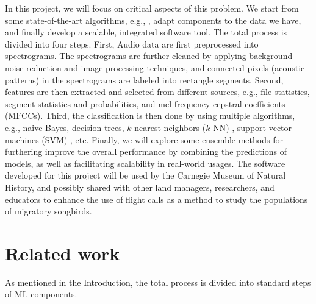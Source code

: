 \documentclass{article} %
\begin{document}
In this project, we will focus on critical aspects of this problem. We start from some state-of-the-art algorithms, e.g., \cite{mlsp2,chennovel13,briggs2013instance,Lasseck13,Massaron13,stattnersong13}, adapt components to the data we have, and finally develop a scalable, integrated software tool. The total process is divided into four steps. First, Audio data are first preprocessed into spectrograms. The spectrograms are further cleaned by applying background noise reduction and image processing techniques, and connected pixels (acoustic patterns) in the spectrograms are labeled into rectangle segments. Second, features are then extracted and selected from different sources, e.g., file statistics, segment statistics and probabilities, and mel-frequency cepstral coefficients (MFCCs). Third, the classification is then done by using multiple algorithms, e.g., naive Bayes, decision trees, $k$-nearest neighbors ($k$-NN) \cite{cover1967nearest}, support vector machines (SVM) \cite{cortes1995support}, etc. Finally, we will explore some ensemble methods \cite{breiman2001random,breiman1996bagging,freund1997decision,hoeting1999bayesian,read2011classifier} for furthering improve the overall performance by combining the predictions of models, as well as facilitating scalability in real-world usages. The software developed for this project will be used by the Carnegie Museum of Natural History, and possibly shared with other land managers, researchers, and educators to enhance the use of flight calls as a method to study the populations of migratory songbirds.


\section{Related work}

As mentioned in the Introduction, the total process is divided into standard steps of ML components.
\end{document}
